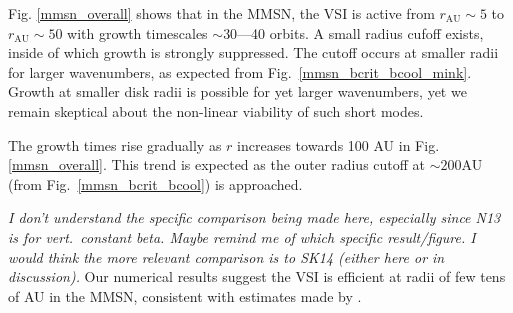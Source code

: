 Fig. \ref{mmsn_overall} shows that in the MMSN, the VSI  is active from $r_\mathrm{AU}\sim 5$ to $r_\mathrm{AU}\sim
50$ with growth timescales $\sim 30$---40 orbits.  A small radius cufoff exists, inside of which growth is strongly suppressed.  The cutoff occurs at smaller radii for larger wavenumbers, as expected from Fig.\ \ref{mmsn_bcrit_bcool_mink}.  Growth at smaller disk radii is possible for yet larger wavenumbers, yet we remain skeptical about the non-linear viability of such short modes.

The growth times rise gradually as $r$ increases towards 100 AU in Fig. \ref{mmsn_overall}.  This trend is expected as the outer radius cutoff at $\sim 200$AU (from Fig.\ \ref{mmsn_bcrit_bcool}) is approached.


%



\emph{I don't understand the specific comparison being made here, especially since N13 is for vert.\ constant beta.  Maybe remind me of which specific result/figure.  I would think the more relevant comparison is to SK14 (either here or in discussion).}
 Our numerical results suggest the VSI
is efficient at radii of few tens of AU in the MMSN, consistent with
estimates made by . 

